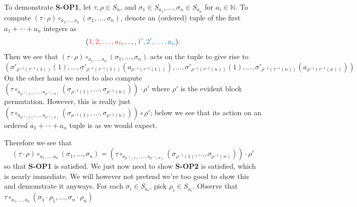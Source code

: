 \begin{example}
To demonstrate \textbf{S-OP1},
let $\tau, \rho \in S_n$, and $\sigma_1 \in S_{a_1}, \dots, \sigma_n\in S_{a_n}$
for $a_i \in \mathbb{N}$. To compute $(\tau \cdot \rho)\circ_{a_1, \dots, a_n}(\sigma_1, \dots, \sigma_n)$, 
denote an (ordered) tuple of the first $a_1 + \cdots + a_n$
integers as 
\[
    (\textcolor{Red}{1, 2, \dots, a_1}, \dots, \textcolor{RoyalBlue}{1', 2', \dots, a_n}).
\]
Then we see that $(\tau \cdot \rho)\circ_{a_1, \dots, a_n}(\sigma_1, \dots, \sigma_n)$
acts on the tuple to give rise to 
\[
    (\sigma'_{\rho^{-1}(\tau^{-1}(1))}(1),\dots, \sigma'_{\rho^{-1}(\tau^{-1}(1))}(a_{\rho^{-1}(\tau^{-1}(1))}), \dots, \sigma'_{\rho^{-1}(\tau^{-1}(n))}(1),\dots, \sigma'_{\rho^{-1}(\tau^{-1}(n))}(a_{\rho^{-1}(\tau^{-1}(n))}))
\]
On the other hand we need to also compute $(\tau \circ_{a_{\rho^{-1}(1)}, \dots, a_{\rho^{-1}(n)}}(\sigma_{\rho^{-1}(1)}, \dots, \sigma_{\rho^{-1}(n)}))\cdot \rho'$ 
where $\rho'$ is the evident block permutation. However, this is really just 
$(\tau \circ_{a_{\rho^{-1}(1)}, \dots, a_{\rho^{-1}(n)}}(\sigma_{\rho^{-1}(1)}, \dots, \sigma_{\rho^{-1}(n)}))\circ \rho'$;
below we see that its action on an ordered $a_1 + \cdots + a_n$ tuple is as we would expect.
\begin{center}
\end{center}
Therefore we see that 
\[
    (\tau \cdot \rho)\circ_{a_1, \dots, a_n}(\sigma_1, \dots, \sigma_n)
    =
    (\tau \circ_{a_{\rho^{-1}(1)}, \dots, a_{\rho^{-1}(n)}}(\sigma_{\rho^{-1}(1)}, \dots, \sigma_{\rho^{-1}(n)}))\cdot \rho'
\]
so that \textbf{S-OP1} is satisfied. We just now need to show \textbf{S-OP2} is satisfied, 
which is nearly immediate. We will however not pretend we're too good to show 
this and demonstrate it anyways. 
For each $\sigma_i \in S_{a_i}$, pick $\rho_i \in S_{a_i}$.
Observe that $\tau \circ_{a_1, \dots, a_n}(\sigma_1 \cdot \rho_1, \dots, \sigma_n \cdot \rho_n)$

\end{example}
